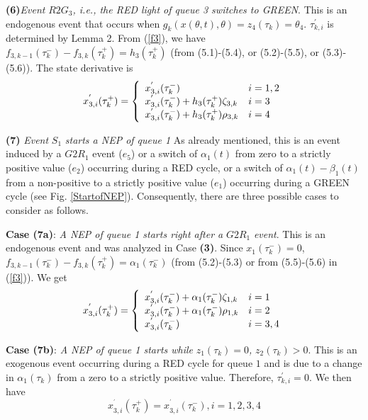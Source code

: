 \documentclass{ifacconf}\usepackage{graphicx}
\begin{document}
\textbf{(6)}\emph{Event }$R2G_{3}$\emph{, i.e., the RED light of queue 3
switches to GREEN}. This is an endogenous event that occurs when
$g_{k}(x(\theta,t),\theta)=z_{4}(\tau_{k})=\theta_{4}$. $\tau_{k,i}^{\prime}$
is determined by Lemma 2. From (\ref{f3}), we have $f_{3,k-1}(\tau_{k}^{-})-f_{3,k}(\tau_{k}^{+})=h_{3}(\tau_{k}^{+})$ (from (5.1)-(5.4), or
(5.2)-(5.5), or (5.3)-(5.6)). The state derivative is
\begin{equation}
x_{3,i}^{^{\prime}}(\tau_{k}^{+})=\left\{
\begin{array}
[c]{ll}x_{3,i}^{^{\prime}}(\tau_{k}^{-}) & i=1,2\\
x_{3,i}^{^{\prime}}(\tau_{k}^{-})+h_{3}(\tau_{k}^{+})\zeta_{3,k} & i=3\\
x_{3,i}^{^{\prime}}(\tau_{k}^{-})+h_{3}(\tau_{k}^{+})\rho_{3,k} & i=4
\end{array}
\right.  \label{type6di}\end{equation}


\textbf{(7)} \emph{Event }$S_{1}$\emph{ starts a NEP of queue 1} As already
mentioned, this is an event induced by a $G2R_{1}$ event ($e_{5}$) or a switch
of $\alpha_{1}(t)$ from zero to a strictly positive value ($e_{2}$) occurring
during a RED cycle, or a switch of $\alpha_{1}(t)-\beta_{1}(t)$ from a
non-positive to a strictly positive value ($e_{1}$) occurring during a GREEN
cycle (see Fig. \ref{StartofNEP}). Consequently, there are three possible
cases to consider as follows.

\textbf{Case (7a)}: \emph{A NEP of queue 1 starts right after a }$G2R_{1}$\emph{ event}. This is an endogenous event and was analyzed in Case
\textbf{(3)}. Since $x_{1}(\tau_{k}^{-})=0$, $f_{3,k-1}(\tau_{k}^{-})-f_{3,k}(\tau_{k}^{+})=\alpha_{1}(\tau_{k}^{-})$ (from (5.2)-(5.3) or from
(5.5)-(5.6) in (\ref{f3})). We get
\begin{equation}
x_{3,i}^{^{\prime}}(\tau_{k}^{+})=\left\{
\begin{array}
[c]{ll}x_{3,i}^{^{\prime}}(\tau_{k}^{-})+\alpha_{1}(\tau_{k}^{-})\zeta_{1,k} & i=1\\
x_{3,i}^{^{\prime}}(\tau_{k}^{-})+\alpha_{1}(\tau_{k}^{-})\rho_{1,k} & i=2\\
x_{3,i}^{^{\prime}}(\tau_{k}^{-}) & i=3,4
\end{array}
\right.  \label{type7adi}\end{equation}


\textbf{Case (7b)}: \emph{ A NEP of queue 1 starts while }$z_{1}(\tau_{k})=0$\emph{,  }$z_{2}(\tau_{k})>0$. This is an exogenous event occurring during
a RED cycle for queue $1$ and is due to a change in $\alpha_{1}(\tau_{k})$
from a zero to a strictly positive value. Therefore, $\tau_{k,i}^{\prime}=0$.
We then have
\begin{equation}
x_{3,i}^{^{\prime}}(\tau_{k}^{+})=x_{3,i}^{^{\prime}}(\tau_{k}^{-}),i=1,2,3,4\label{7b}\end{equation}
\end{document}
